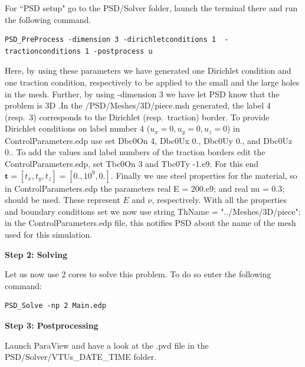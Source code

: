 \documentclass{report}
\begin{document}
For ``PSD setup" go to the {\ttfamily PSD/Solver} folder, launch the terminal there and run the following command.
\begin{lstlisting}[style=Linux]
PSD_PreProcess -dimension 3 -dirichletconditions 1  -tractionconditions 1 -postprocess u
\end{lstlisting}
Here, by using these parameters we have generated one Dirichlet condition and one traction condition, respectively to be applied to the small and the large holes in the mesh. Further, by using {\ttfamily -dimension 3} we have let PSD know that the problem is 3D .In the {\ttfamily /PSD/Meshes/3D/piece.msh} generated, the label 4 (resp.~3) corresponds to the Dirichlet (resp.~traction) border. 
To provide Dirichlet conditions on label number 4 ($u_x=0,u_y=0,u_z=0$) in {\ttfamily ControlParameters.edp} use set {\ttfamily Dbc0On 4}, {\ttfamily Dbc0Ux 0.}, {\ttfamily Dbc0Uy 0.}, and {\ttfamily Dbc0Uz 0.}. To add the values and label numbers of the traction borders edit the  {\ttfamily ControlParameters.edp}, set  {\ttfamily Tbc0On 3} and {\ttfamily Tbc0Ty -1.e9}. For this end $\mathbf t=[t_x,t_y,t_z]=[0.,10^9,0.]$. Finally we use steel properties for the material, so in {\ttfamily ControlParameters.edp} the parameters {\ttfamily real E  = 200.e9;} and {\ttfamily real nu = 0.3;} should be used. These represent $E$ and $\nu$, respectively. With all the properties and boundary conditions set we now use  {\ttfamily string ThName = "../Meshes/3D/piece";} in the {\ttfamily ControlParameters.edp} file, this notifies PSD about the name of the mesh used for this simulation.  

\textbf{Step 2: Solving}

Let us now use 2 cores to solve this problem. To do so enter the following command:

\begin{lstlisting}[style=Linux]
PSD_Solve -np 2 Main.edp
\end{lstlisting}

\textbf{Step 3: Postprocessing}

Launch ParaView and have a look at the  {\ttfamily .pvd} file in the  {\ttfamily PSD/Solver/VTUs\_DATE\_TIME} folder. 
\end{document}

